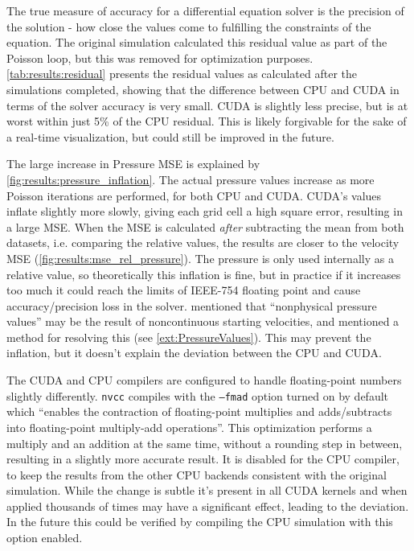 

The true measure of accuracy for a differential equation solver is the precision of the solution - how close the values come to fulfilling the constraints of the equation.
The original simulation calculated this residual value as part of the Poisson loop, but this was removed for optimization purposes.
\cref{tab:results:residual} presents the residual values as calculated after the simulations completed, showing that the difference between CPU and CUDA in terms of the solver accuracy is very small.
CUDA is slightly less precise, but is at worst within just 5\% of the CPU residual.
This is likely forgivable for the sake of a real-time visualization, but could still be improved in the future.




The large increase in Pressure MSE is explained by \cref{fig:results:pressure_inflation}.
The actual pressure values increase as more Poisson iterations are performed, for both CPU and CUDA.
CUDA's values inflate slightly more slowly, giving each grid cell a high square error, resulting in a large MSE.
When the MSE is calculated \emph{after} subtracting the mean from both datasets, i.e. comparing the relative values, the results are closer to the velocity MSE (\cref{fig:results:mse_rel_pressure}).
The pressure is only used internally as a relative value, so theoretically this inflation is fine, but in practice if it increases too much it could reach the limits of IEEE-754 floating point\cite{IEEEFloat75419} and cause accuracy/precision loss in the solver.
\cite{book:griebel1998numerical} mentioned that ``nonphysical pressure values'' may be the result of noncontinuous starting velocities, and mentioned a method for resolving this (see \cref{ext:PressureValues}). This may prevent the inflation, but it doesn't explain the deviation between the CPU and CUDA.

The CUDA and CPU compilers are configured to handle floating-point numbers slightly differently.
\texttt{nvcc} compiles with the \texttt{--fmad} option turned on by default\cite{NvccFmad} which ``enables the contraction of floating-point multiplies and adds/subtracts into floating-point multiply-add operations''.
This optimization performs a multiply and an addition at the same time, without a rounding step in between, resulting in a slightly more accurate result\cite{NvidiaFMAJustification}.
It is disabled for the CPU compiler, to keep the results from the other CPU backends consistent with the original simulation.
While the change is subtle it's present in all CUDA kernels and when applied thousands of times may have a significant effect, leading to the deviation.
In the future this could be verified by compiling the CPU simulation with this option enabled.

